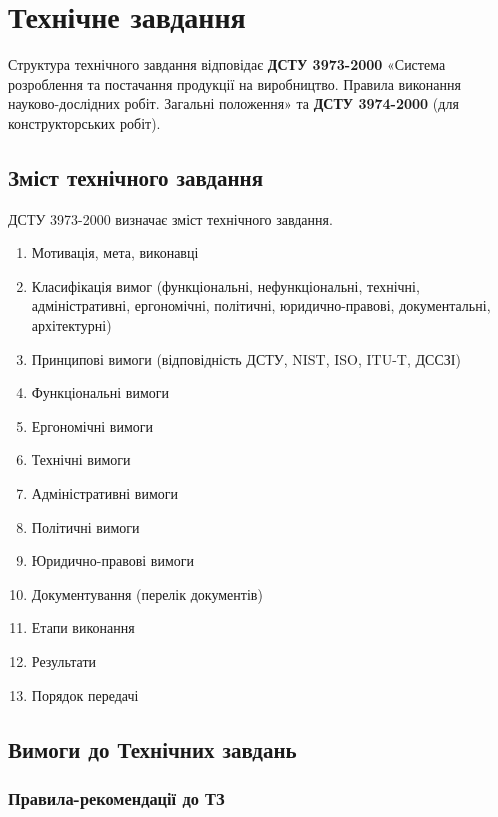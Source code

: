 \documentclass{article}
\begin{document}
\newpage
\section{Технічне завдання}
Структура технічного завдання відповідає \textbf{ДСТУ 3973-2000} «Система розроблення та постачання
продукції на виробництво. Правила виконання науково-дослідних робіт. Загальні
положення» та \textbf{ДСТУ 3974-2000} (для конструкторських робіт).

\subsection{Зміст технічного завдання}
ДСТУ 3973-2000 визначає зміст технічного завдання.

\begin{enumerate}
\item Мотивація, мета, виконавці
\item Класифікація вимог (функціональні, нефункціональні, технічні, адміністративні, ергономічні,
      політичні, юридично-правові, документальні, архітектурні)
\item Принципові вимоги (відповідність ДСТУ, NIST, ISO, ITU-T, ДССЗІ)
\item Функціональні вимоги
\item Ергономічні вимоги
\item Технічні вимоги
\item Адміністративні вимоги
\item Політичні вимоги
\item Юридично-правові вимоги
\item Документування (перелік документів)
\item Етапи виконання
\item Результати
\item Порядок передачі
\end{enumerate}

\subsection{Вимоги до Технічних завдань}
\subsubsection{Правила-рекомендації до ТЗ}
\end{document}
